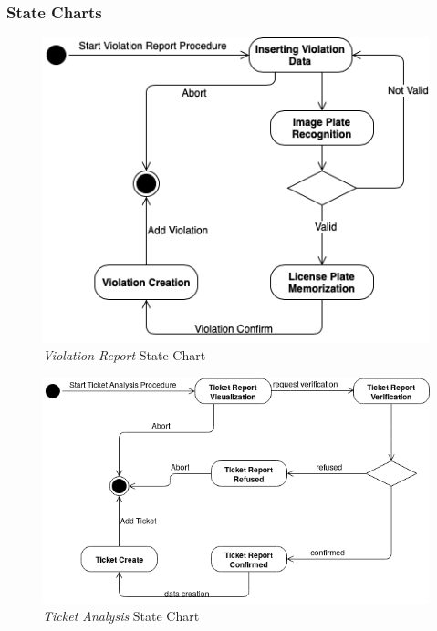 \documentclass {article}
\begin{document}
	\subsubsection{State Charts}	
	\begin{figure}[H]
				\centering
				\includegraphics[scale=0.6]{Images/Diagrams/ViolationStateChart.png}
				\caption{{\it Violation Report} State Chart}
	\end{figure}
	\begin{figure}[H]
				\centering
				\includegraphics[scale=0.6]{Images/Diagrams/TicketStateChart.png}
				\caption{{\it Ticket Analysis} State Chart}
	\end{figure}
	\pagebreak
		
\end{document}
